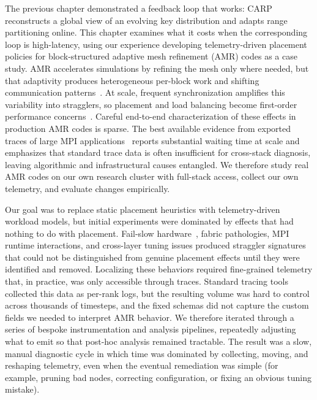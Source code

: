 
The previous chapter demonstrated a feedback loop that works: CARP reconstructs a global view of
an evolving key distribution and adapts range partitioning online.
This chapter examines what it costs when the corresponding loop is high-latency, using our
experience developing telemetry-driven placement policies for block-structured adaptive mesh
refinement (AMR) codes as a case study.
AMR accelerates simulations by refining the mesh only where needed, but that adaptivity produces
heterogeneous per-block work and shifting communication
patterns~\cite{Dubey2014:Survey, Burst2011:p4est}.
At scale, frequent synchronization amplifies this variability into
stragglers, so placement and load balancing become first-order performance
concerns~\cite{Dubey2014:Survey, Burst2008:ALPS}.
Careful end-to-end characterization of these effects in production AMR codes is sparse.
The best available evidence from exported traces of large MPI
applications~\cite{Klenk2017:OverviewMPICharacteristics} reports substantial waiting time at scale
and emphasizes that standard trace data is often insufficient for cross-stack diagnosis, leaving
algorithmic and infrastructural causes entangled.
We therefore study real AMR codes on our own research cluster with full-stack access, collect our
own telemetry, and evaluate changes empirically.

Our goal was to replace static placement heuristics with telemetry-driven workload models, but
initial experiments were dominated by effects that had nothing to do with placement.
Fail-slow hardware~\cite{Gunaw2018:FailSlow}, fabric pathologies, MPI runtime
interactions, and cross-layer tuning issues produced straggler signatures that could not be
distinguished from genuine placement effects until they were identified and removed.
Localizing these behaviors required fine-grained telemetry that, in practice, was only accessible
through traces.
Standard tracing tools~\cite{Shend2006:TAU, Knupf2012:Score-P} collected this data as per-rank
logs, but the resulting volume was hard to control across thousands of timesteps, and the fixed
schemas did not capture the custom fields we needed to interpret AMR behavior.
We therefore iterated through a series of bespoke instrumentation and analysis pipelines,
repeatedly adjusting what to emit so that post-hoc analysis remained tractable.
The result was a slow, manual diagnostic cycle in which time was dominated by collecting, moving,
and reshaping telemetry, even when the eventual remediation was simple (for example, pruning bad
nodes, correcting configuration, or fixing an obvious tuning mistake).

